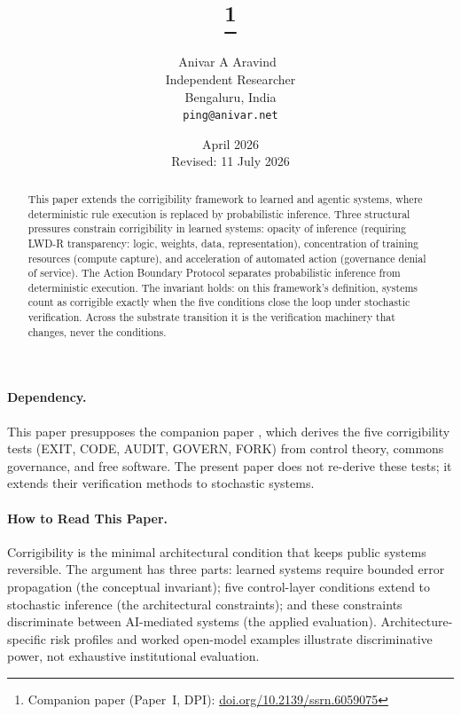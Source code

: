 \documentclass{article}
\title{\papertitle\thanks{Companion paper (Paper~I, DPI): \href{https://doi.org/10.2139/ssrn.6059075}{doi.org/10.2139/ssrn.6059075}}}
\author{
  Anivar A Aravind~\orcidlink{0009-0009-8995-0005} \\
  Independent Researcher\\
  Bengaluru, India \\
  \texttt{ping@anivar.net}
}
\date{April 2026 \\ {\small Revised: 11 July 2026}}
\theoremstyle{definition}
\begin{document}
\maketitle

\begin{abstract}
This paper extends the corrigibility framework to learned and agentic systems, where deterministic rule execution is replaced by probabilistic inference. Three structural pressures constrain corrigibility in learned systems: opacity of inference (requiring LWD-R transparency: logic, weights, data, representation), concentration of training resources (compute capture), and acceleration of automated action (governance denial of service). The Action Boundary Protocol separates probabilistic inference from deterministic execution. The invariant holds: on this framework's definition, systems count as corrigible exactly when the five conditions close the loop under stochastic verification. Across the substrate transition it is the verification machinery that changes, never the conditions.
\end{abstract}

\paragraph{Dependency.} This paper presupposes the companion paper \citep{aravind2026dpi}, which derives the five corrigibility tests (EXIT, CODE, AUDIT, GOVERN, FORK) from control theory, commons governance, and free software. The present paper does not re-derive these tests; it extends their verification methods to stochastic systems.


\paragraph{How to Read This Paper.}
Corrigibility is the minimal architectural condition that keeps public systems reversible. The argument has three parts: learned systems require bounded error propagation (the conceptual invariant); five control-layer conditions extend to stochastic inference (the architectural constraints); and these constraints discriminate between AI-mediated systems (the applied evaluation). Architecture-specific risk profiles and worked open-model examples illustrate discriminative power, not exhaustive institutional evaluation.
\end{document}
